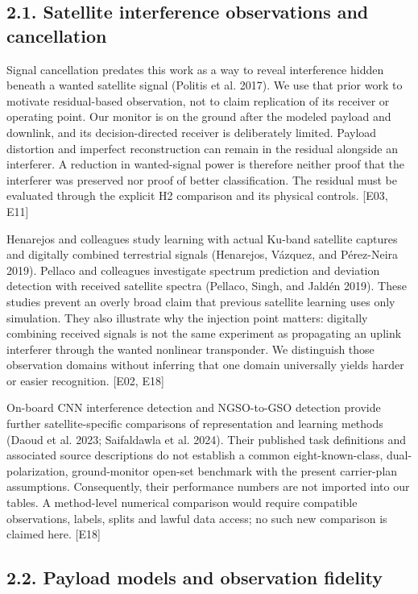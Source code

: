 \documentclass[
  10pt,
]{article}
\begin{document}
\subsection{2.1. Satellite interference observations and
cancellation}\label{satellite-interference-observations-and-cancellation}

Signal cancellation predates this work as a way to reveal interference
hidden beneath a wanted satellite signal (Politis et al. 2017). We use
that prior work to motivate residual-based observation, not to claim
replication of its receiver or operating point. Our monitor is on the
ground after the modeled payload and downlink, and its decision-directed
receiver is deliberately limited. Payload distortion and imperfect
reconstruction can remain in the residual alongside an interferer. A
reduction in wanted-signal power is therefore neither proof that the
interferer was preserved nor proof of better classification. The
residual must be evaluated through the explicit H2 comparison and its
physical controls. {[}E03, E11{]}

Henarejos and colleagues study learning with actual Ku-band satellite
captures and digitally combined terrestrial signals (Henarejos, Vázquez,
and Pérez-Neira 2019). Pellaco and colleagues investigate spectrum
prediction and deviation detection with received satellite spectra
(Pellaco, Singh, and Jaldén 2019). These studies prevent an overly broad
claim that previous satellite learning uses only simulation. They also
illustrate why the injection point matters: digitally combining received
signals is not the same experiment as propagating an uplink interferer
through the wanted nonlinear transponder. We distinguish those
observation domains without inferring that one domain universally yields
harder or easier recognition. {[}E02, E18{]}

On-board CNN interference detection and NGSO-to-GSO detection provide
further satellite-specific comparisons of representation and learning
methods (Daoud et al. 2023; Saifaldawla et al. 2024). Their published
task definitions and associated source descriptions do not establish a
common eight-known-class, dual-polarization, ground-monitor open-set
benchmark with the present carrier-plan assumptions. Consequently, their
performance numbers are not imported into our tables. A method-level
numerical comparison would require compatible observations, labels,
splits and lawful data access; no such new comparison is claimed here.
{[}E18{]}

\subsection{2.2. Payload models and observation
fidelity}\label{payload-models-and-observation-fidelity}
\end{document}
